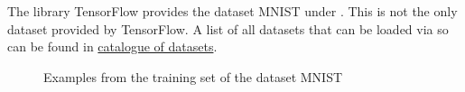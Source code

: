 The library TensorFlow provides the dataset MNIST under . This is not the only dataset provided by TensorFlow. A list of all datasets that can be loaded via so can be found in \href{https://www.tensorflow.org/datasets/catalog/overview#all_datasets}{catalogue of datasets}.


\begin{figure}
    \caption{Examples from the training set of the dataset MNIST \cite{Siddique:2019}}
\end{figure}

